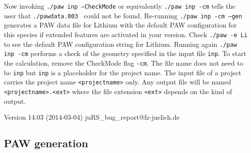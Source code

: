 \documentclass[12pt,BCOR8mm,noappendixprefix,nochapterprefix,bibtotoc,idxtotoc,openbib,tablecaptionabove]{scrbook}
\newcommand{\ttt}[1]{\texttt{#1}}
\begin{document}
Now invoking \ttt{./paw inp --CheckMode} or equivalently \ttt{./paw inp -cm} tells 
the user that \ttt{./pawdata.003 } could not be found. Re-running \ttt{./paw inp -cm --gen } generates 
a PAW data file for Lithium with the default PAW configuration for this species 
if extended features are activated in your version. Check \ttt{./paw -e Li } to see the 
default PAW configuration string for Lithium. 
Running again \ttt{./paw inp -cm} performs a check of the geometry specified in the input file \ttt{inp}. 
To start the calculation, remove the CheckMode flag \ttt{-cm}. 
The file name does not need to be \ttt{inp} but \ttt{inp} is a placeholder for the project name. 
The input file of a project carries the project name \ttt{<projectname>} only. 
Any output file will be named \ttt{<projectname>.<ext>} where the file extension \ttt{<ext>} depends on the kind of output.

% 

\vspace{.5cm}
\noindent Version 14.03 (2014-03-04) juRS\_bug\_report@fz-juelich.de

\newpage
\subsection*{PAW generation}
\end{document}
